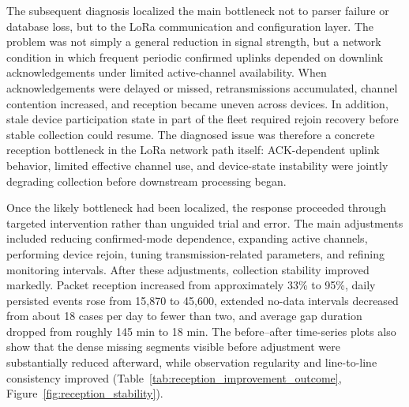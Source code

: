 \documentclass[systems,article,accept,pdftex,moreauthors]{Definitions/mdpi}
\begin{document}
The subsequent diagnosis localized the main bottleneck not to parser failure or database loss, but to the LoRa communication and configuration layer. The problem was not simply a general reduction in signal strength, but a network condition in which frequent periodic confirmed uplinks depended on downlink acknowledgements under limited active-channel availability. When acknowledgements were delayed or missed, retransmissions accumulated, channel contention increased, and reception became uneven across devices. In addition, stale device participation state in part of the fleet required rejoin recovery before stable collection could resume. The diagnosed issue was therefore a concrete reception bottleneck in the LoRa network path itself: ACK-dependent uplink behavior, limited effective channel use, and device-state instability were jointly degrading collection before downstream processing began.

Once the likely bottleneck had been localized, the response proceeded through targeted intervention rather than unguided trial and error. The main adjustments included reducing confirmed-mode dependence, expanding active channels, performing device rejoin, tuning transmission-related parameters, and refining monitoring intervals. After these adjustments, collection stability improved markedly. Packet reception increased from approximately 33\% to 95\%, daily persisted events rose from 15{,}870 to 45{,}600, extended no-data intervals decreased from about 18 cases per day to fewer than two, and average gap duration dropped from roughly 145 min to 18 min. The before--after time-series plots also show that the dense missing segments visible before adjustment were substantially reduced afterward, while observation regularity and line-to-line consistency improved (Table~\ref{tab:reception_improvement_outcome}, Figure~\ref{fig:reception_stability}).
\end{document}
